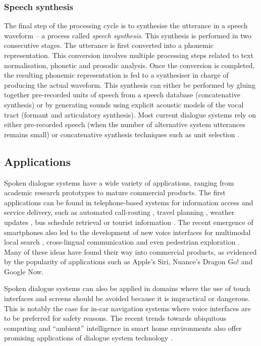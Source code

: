 \subsubsection*{Speech synthesis}
The final step of the processing cycle is to synthesise the utterance in a speech waveform --  a process called \textit{speech synthesis}.  This synthesis is performed in two consecutive stages.  The utterance is first converted into a phonemic representation. This conversion involves multiple processing steps related to text normalisation, phonetic and prosodic analysis.  Once the conversion is completed, the resulting phonemic representation is fed to a synthesiser in charge of producing the actual waveform. This synthesis can either be performed by gluing together pre-recorded units of speech from a speech database (concatenative synthesis) or by generating sounds using explicit acoustic models of the vocal tract (formant and articulatory synthesis). Most current dialogue systems rely on either pre-recorded speech (when the number of alternative system utterances remains small) or concatenative synthesis techniques such as unit selection \citep{hunt1996}.

\subsection{Applications}

Spoken dialogue systems have a wide variety of applications, ranging from academic research prototypes to mature commercial products. The first applications can be found in telephone-based systems for information access and service delivery, such as automated call-routing \citep{GorinRW97}, travel planning \citep{walker2001}, weather updates \citep{jupiter}, bus schedule retrieval \citep{RauxLBBE05} or tourist information \citep{lemon2006}.  The recent emergence of smartphones also led to the development of new voice interfaces for multimodal local search \citep{EhlenJ13}, cross-lingual communication \citep{yochina} and even pedestrian exploration  \citep{janarthanam2012integrating}.  Many of these ideas have found their way into commercial products, as evidenced by the popularity of applications such as Apple's Siri, Nuance's Dragon Go! and Google Now. 

Spoken dialogue systems can also be applied in domains where the use of touch interfaces and screens should be avoided because it is impractical or dangerous.  This is notably the case for in-car navigation systems \citep{cumove,CastronovoMPM10} where voice interfaces are to be preferred for safety reasons.  The recent trends towards ubiquitous computing and ``ambient'' intelligence in smart home environments also offer promising applications of dialogue system technology \citep{vipperla2009a,ambient2010}.

